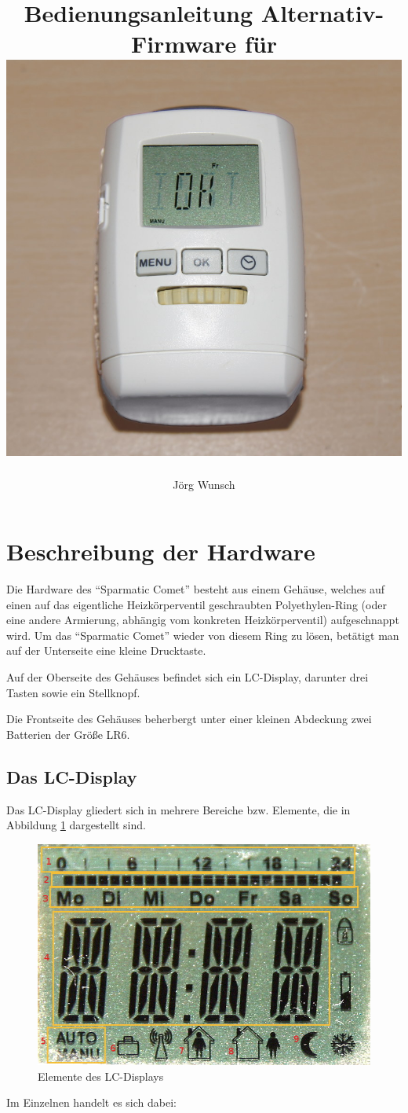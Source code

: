 \documentclass[a5paper]{article}
\title {
  Bedienungsanleitung Alternativ-Firmware für \SC\\
  \vspace*{1ex}
  {\centering\includegraphics[width=0.63\linewidth]{Comet.jpg}}
}
\author {
Jörg Wunsch
}
\newcommand\SC{"`Sparmatic Comet"'}
\begin{document}
\maketitle
\thispagestyle{empty}
\pagebreak


\section {
Beschreibung der Hardware
}

Die Hardware des \SC{} besteht aus einem Gehäuse, welches auf einen
auf das eigentliche Heizkörperventil geschraubten Polyethylen-Ring
(oder eine andere Armierung, abhängig vom konkreten Heizkörperventil)
aufgeschnappt wird.  Um das \SC{} wieder von diesem Ring zu lösen,
betätigt man auf der Unterseite eine kleine Drucktaste.

Auf der Oberseite des Gehäuses befindet sich ein LC-Display, darunter
drei Tasten sowie ein Stellknopf.

Die Frontseite des Gehäuses beherbergt unter einer kleinen Abdeckung zwei
Batterien der Größe LR6.

\subsection {
  Das LC-Display
}

Das LC-Display gliedert sich in mehrere Bereiche bzw. Elemente, die in
Abbildung \ref{fig:LCD} dargestellt sind.

\begin{figure}[h]
\centering\includegraphics[width=0.7\linewidth]{LCD.jpg}
\caption{Elemente des LC-Displays}
\label{fig:LCD}
\end{figure}

Im Einzelnen handelt es sich dabei:
\end{document}
